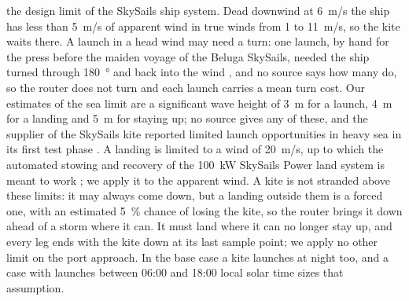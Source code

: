 the design limit of the SkySails ship system. Dead downwind at \SI{6}{m/s} the ship has less than \SI{5}{m/s} of apparent wind in true winds from 1 to \SI{11}{m/s}, so the kite waits there. A launch in a head wind may need a turn: one launch, by hand for the press before the maiden voyage of the Beluga SkySails, needed the ship turned through \SI{180}{\degree} and back into the wind \citep{wiwo2008}, and no source says how many do, so the router does not turn and each launch carries a mean turn cost. Our estimates of the sea limit are a significant wave height of \SI{3}{m} for a launch, \SI{4}{m} for a landing and \SI{5}{m} for staying up; no source gives any of these, and the supplier of the SkySails kite reported limited launch opportunities in heavy sea in its first test phase \citep{cedelft2016}. A landing is limited to a wind of \SI{20}{m/s}, up to which the automated stowing and recovery of the \SI{100}{kW} SkySails Power land system is meant to work \citep{skypower100_tib}; we apply it to the apparent wind. A kite is not stranded above these limits: it may always come down, but a landing outside them is a forced one, with an estimated \SI{5}{\percent} chance of losing the kite, so the router brings it down ahead of a storm where it can. It must land where it can no longer stay up, and every leg ends with the kite down at its last sample point; we apply no other limit on the port approach. In the base case a kite launches at night too, and a case with launches between 06:00 and 18:00 local solar time sizes that assumption.

